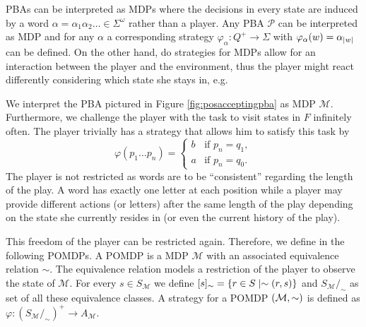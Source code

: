 \acp{PBA} can be interpreted as \acp{MDP} where the decisions in every state
are induced by a word $\alpha = \alpha_{1}\alpha_{2}\dots\in\Sigma^{\omega}$
rather than a player. Any \ac{PBA} $\mathcal{P}$ can be interpreted as \ac{MDP}
and for any $\alpha$ a corresponding strategy
$\varphi_{\alpha}:Q^{+}\rightarrow\Sigma$ with
$\varphi_{\alpha}(w) = \alpha_{\left\vert{w}\right\vert}$ can be defined. On the other hand, do
strategies for \acp{MDP} allow for an interaction between the player and the
environment, thus the player might react differently considering which state
she stays in, e.g.
\begin{example}
  We interpret the \ac{PBA} pictured in Figure \ref{fig:posacceptingpba} as
  \ac{MDP} $\mathcal{M}$. Furthermore, we challenge the player with the task to
  visit states in $F$ infinitely often. The player trivially has a strategy 
  that allows him to satisfy this task by
  \begin{equation*}
    \varphi(p_{1}\dots p_{n}) = \begin{cases}
      b&\text{if }p_{n} = q_{1},\\
      a&\text{if }p_{n} = q_{0}.
    \end{cases}
  \end{equation*}
  The player is not restricted as words are to be \enquote{consistent} 
  regarding the length of the play. A word has exactly one letter at each 
  position while a player may provide different actions (or letters) after
  the same length of the play depending on the state she currently resides in
  (or even the current history of the play).
  \label{ex:pbaasmdp}
\end{example}
This freedom of the player can be restricted again. Therefore, we define in the
following \acp{POMDP}. A \ac{POMDP} is a \ac{MDP} $\mathcal{M}$ with an 
associated equivalence relation $\sim$. The equivalence relation models a 
restriction of the player to observe the state of $\mathcal{M}$. For every
$s\in S_{\mathcal{M}}$ we define
$[s]_{\sim} = \left\{r\in S\mid \sim(r,s)\right\}$ and
$S_{\mathcal{M}}/_{\sim}$ as set of all these equivalence classes. A
strategy for a \ac{POMDP} $\left(\mathcal{M}, \sim\right)$ is defined as
$\varphi:(S_{\mathcal{M}}/_{\sim})^{+}\rightarrow A_{\mathcal{M}}$.
